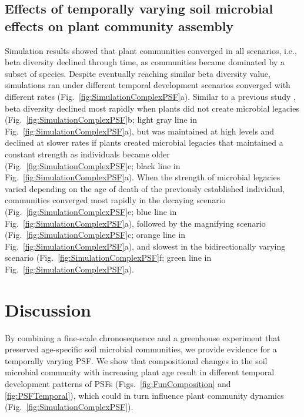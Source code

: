 \subsection*{Effects of temporally varying soil microbial effects on plant community assembly}
Simulation results showed that plant communities converged in all scenarios, i.e., beta diversity declined through time, as communities became dominated by a subset of species. Despite eventually reaching similar beta diversity value, simulations ran under different temporal development scenarios converged with different rates (Fig.~\ref{fig:SimulationComplexPSF}a). Similar to a previous study \citep{Fukami2013}, beta diversity declined most rapidly when plants did not create microbial legacies (Fig.~\ref{fig:SimulationComplexPSF}b; light gray line in Fig.~\ref{fig:SimulationComplexPSF}a), but was maintained at high levels and declined at slower rates if plants created microbial legacies that maintained a constant strength as individuals became older (Fig.~\ref{fig:SimulationComplexPSF}c; black line in Fig.~\ref{fig:SimulationComplexPSF}a).
When the strength of microbial legacies varied depending on the age of death of the previously established individual, communities converged most rapidly in the decaying scenario (Fig.~\ref{fig:SimulationComplexPSF}e; blue line in Fig.~\ref{fig:SimulationComplexPSF}a), followed by the magnifying scenario (Fig.~\ref{fig:SimulationComplexPSF}c; orange line in Fig.~\ref{fig:SimulationComplexPSF}a), and slowest in the bidirectionally varying scenario (Fig.~\ref{fig:SimulationComplexPSF}f; green line in Fig.~\ref{fig:SimulationComplexPSF}a).
\par



\section{Discussion}
By combining a fine-scale chronosequence and a greenhouse experiment that preserved age-specific soil microbial communities, we provide evidence for a temporally varying PSF. 
We show that compositional changes in the soil microbial community with increasing plant age result in different temporal development patterns of PSFs (Figs.~\ref{fig:FunComposition} and \ref{fig:PSFTemporal}), which could in turn influence plant community dynamics (Fig.~\ref{fig:SimulationComplexPSF}). 
\par


